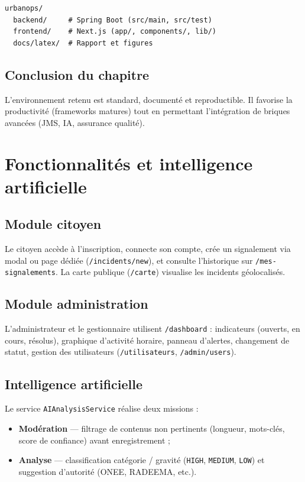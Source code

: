 \documentclass[12pt,a4paper,oneside]{report}
\begin{document}
\begin{verbatim}
urbanops/
  backend/     # Spring Boot (src/main, src/test)
  frontend/    # Next.js (app/, components/, lib/)
  docs/latex/  # Rapport et figures
\end{verbatim}

\section{Conclusion du chapitre}

L'environnement retenu est standard, documenté et reproductible. Il favorise la productivité (frameworks matures) tout en permettant l'intégration de briques avancées (JMS, IA, assurance qualité).

\chapter{Fonctionnalités et intelligence artificielle}

\section{Module citoyen}

Le citoyen accède à l'inscription, connecte son compte, crée un signalement via modal ou page dédiée (\texttt{/incidents/new}), et consulte l'historique sur \texttt{/mes-signalements}. La carte publique (\texttt{/carte}) visualise les incidents géolocalisés.

\section{Module administration}

L'administrateur et le gestionnaire utilisent \texttt{/dashboard} : indicateurs (ouverts, en cours, résolus), graphique d'activité horaire, panneau d'alertes, changement de statut, gestion des utilisateurs (\texttt{/utilisateurs}, \texttt{/admin/users}).

\section{Intelligence artificielle}

Le service \texttt{AIAnalysisService} réalise deux missions :
\begin{itemize}[leftmargin=*]
  \item \textbf{Modération} — filtrage de contenus non pertinents (longueur, mots-clés, score de confiance) avant enregistrement ;
  \item \textbf{Analyse} — classification catégorie / gravité (\texttt{HIGH}, \texttt{MEDIUM}, \texttt{LOW}) et suggestion d'autorité (ONEE, RADEEMA, etc.).
\end{itemize}
\end{document}
